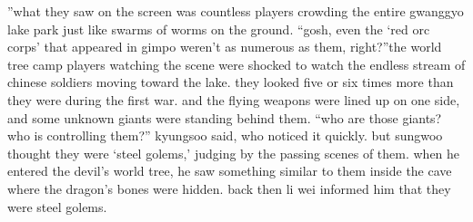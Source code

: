 ”what they saw on the screen was countless players crowding the entire gwanggyo lake park just like swarms of worms on the ground.
“gosh, even the ‘red orc corps’ that appeared in gimpo weren’t as numerous as them, right?”the world tree camp players watching the scene were shocked to watch the endless stream of chinese soldiers moving toward the lake.
 they looked five or six times more than they were during the first war.
and the flying weapons were lined up on one side, and some unknown giants were standing behind them.
“who are those giants? who is controlling them?” kyungsoo said, who noticed it quickly.
but sungwoo thought they were ‘steel golems,’ judging by the passing scenes of them.
when he entered the devil’s world tree, he saw something similar to them inside the cave where the dragon’s bones were hidden.
 back then li wei informed him that they were steel golems.

